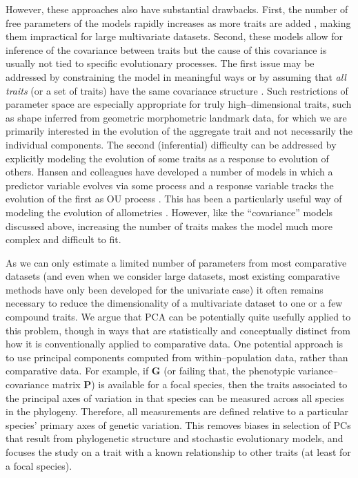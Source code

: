 \documentclass[a4paper,12pt]{article}
\begin{document}
However, these approaches also have substantial drawbacks. First, the number of free parameters of the models rapidly increases as more traits are added \citep{RevellHarmon2008}, making them impractical for large multivariate datasets. Second, these models allow for inference of the covariance between traits but the cause of this covariance is usually not tied to specific evolutionary processes. The first issue may be addressed by constraining the model in meaningful ways \citep{ButlerKing2004} or by assuming that \emph{all traits} (or a set of traits) have the same covariance structure \citep{Klingenberg2013, Adams2014}. Such restrictions of parameter space are especially appropriate for truly high--dimensional traits, such as shape inferred from geometric morphometric landmark data, for which we are primarily interested in the evolution of the aggregate trait and not necessarily the individual components. The second (inferential) difficulty can be addressed by explicitly modeling the evolution of some traits as a response to evolution of others. Hansen and colleagues have developed a number of models in which a predictor variable evolves via some process and a response variable tracks the evolution of the first as OU process \citep{Hansen2008, Hansen2012SysBio, Bartoszek2012}. This has been a particularly useful way of modeling the evolution of allometries \citep{Hansen2012SysBio, Voje2013}. However, like the ``covariance''  models discussed above, increasing the number of traits makes the model much more complex and difficult to fit.

As we can only estimate a limited number of parameters from most comparative datasets (and even when we consider large datasets, most existing comparative methods have only been developed for the univariate case) it often remains necessary to reduce the dimensionality of a multivariate dataset to one or a few compound traits. We argue that PCA can be potentially quite usefully applied to this problem, though in ways that are statistically and conceptually distinct from how it is conventionally applied to comparative data. One potential approach is to use principal components computed from within--population data, rather than comparative data. For example, if $\mathbf{G}$ (or failing that, the phenotypic variance--covariance matrix $\mathbf{P}$) is available for a focal species, then the traits associated to the principal axes of variation in that species can be measured across all species in the phylogeny. Therefore, all measurements are defined relative to a particular species' primary axes of genetic variation. This removes biases in selection of PCs that result from phylogenetic structure and stochastic evolutionary models, and focuses the study on a trait with a known relationship to other traits (at least for a focal species). 
\end{document}
